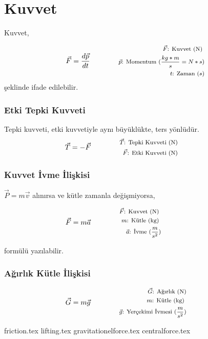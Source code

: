 \section{Kuvvet}

Kuvvet,

\begin{equation}
    \vec{F} = \frac{d\vec{p}}{dt} \qquad \qquad \parbox{4cm}{\footnotesize$
    \begin{aligned}
        \vec{F}\text{: Kuvvet (N) } \\
        \vec{p}\text{: Momentum } (\frac{kg*m}{s} = N*s) \\
        t\text{: Zaman } (s)
    \end{aligned}$
    }
\end{equation}
şeklinde ifade edilebilir.

\subsubsection*{Etki Tepki Kuvveti}
Tepki kuvveti, etki kuvvetiyle aynı büyüklükte, ters yönlüdür.
\begin{equation}
    \vec{T} = -\vec{F} \qquad \qquad \parbox{4cm}{\footnotesize$\begin{aligned}
        \vec{T}\text{: Tepki Kuvveti (N) } \\
        \vec{F}\text{: Etki Kuvveti (N) }
\end{aligned}$}
\end{equation}

\subsubsection*{Kuvvet İvme İlişkisi}

$\vec{P} = m\vec{v}$ alınırsa ve kütle zamanla değişmiyorsa,

\begin{equation}
    \vec{F} = m\vec{a} \qquad \qquad \parbox{4cm}{\footnotesize$\begin{aligned}
        \vec{F}\text{: Kuvvet (N) } \\
        m\text{: Kütle (kg) } \\
        \vec{a}\text{: İvme } (\frac{m}{s^2})
    \end{aligned}$}
\end{equation}

formülü yazılabilir.

\subsubsection*{Ağırlık Kütle İlişkisi}
\begin{equation}
    \vec{G} = m\vec{g} \qquad \qquad \parbox{4cm}{\footnotesize$\begin{aligned}
        \vec{G}\text{: Ağırlık (N)} \\
        m\text{: Kütle (kg) } \\
        \vec{g}\text{: Yerçekimi İvmesi } (\frac{m}{s^2})
\end{aligned}$}
\end{equation}

{friction.tex}
{lifting.tex}
{gravitationelforce.tex}
{centralforce.tex}
